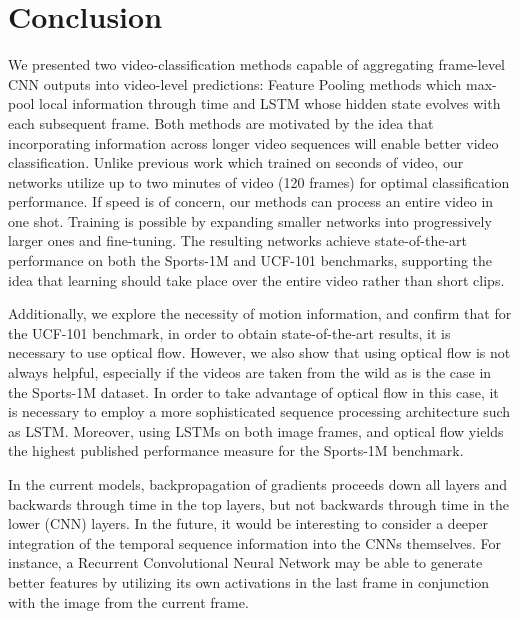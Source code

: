 \documentclass[10pt,twocolumn,letterpaper]{article}
\begin{document}
%
\section{Conclusion}\vspace{-1em}
We presented two video-classification methods capable of
aggregating frame-level CNN outputs into video-level predictions:
Feature Pooling methods which max-pool local information through time
and LSTM whose hidden state evolves with each subsequent frame. Both
methods are motivated by the idea that incorporating information across
longer video sequences will enable better video classification. Unlike
previous work which trained on seconds of video, our networks utilize
up to two minutes of video (120 frames) for optimal classification performance.
If speed is of concern, our methods can process an entire video in one shot.
Training is possible by expanding smaller networks into progressively larger
ones and fine-tuning. The resulting networks
achieve state-of-the-art performance on both the Sports-1M and UCF-101
benchmarks, supporting the idea that learning should take place over the entire
video rather than short clips.

Additionally, we explore the necessity of motion information, and
confirm that for the UCF-101 benchmark, in order to obtain
state-of-the-art results, it is necessary to use optical
flow. However, we also show that using optical flow is not always
helpful, especially if the videos are taken from the wild as is the
case in the Sports-1M dataset. In order to take advantage of optical
flow in this case, it is necessary to employ a more sophisticated
sequence processing architecture such as LSTM. Moreover, using LSTMs
on both image frames, and optical flow yields the highest published
performance measure for the Sports-1M benchmark.

In the current models, backpropagation of gradients proceeds down
all layers and backwards through time in the top layers, but
not backwards through time in the lower (CNN) layers. In the future,
it would be interesting to consider a deeper integration of the temporal sequence information
 into the CNNs themselves. For instance, a Recurrent Convolutional Neural Network may
be able to generate better features by utilizing its own activations
in the last frame in conjunction with the image from the current
frame.


{\small


}
\end{document}
